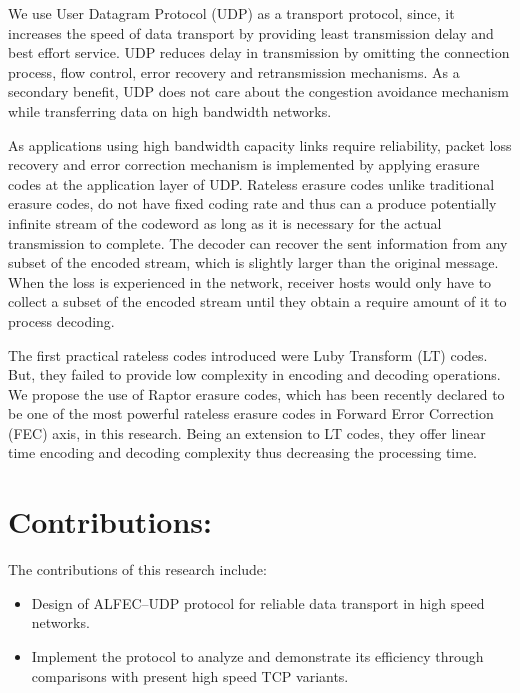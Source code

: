 We use User Datagram Protocol (UDP) as a transport protocol, since, it increases the speed of data transport by providing least transmission delay and best effort service. UDP reduces delay in transmission by omitting the connection process, flow control, error recovery and retransmission mechanisms. As a secondary benefit, UDP does not care about the congestion avoidance mechanism while transferring data on high bandwidth networks. 

As applications using high bandwidth capacity links require reliability, packet loss recovery and error correction mechanism is implemented by applying erasure codes at the application layer of UDP. Rateless erasure codes unlike traditional erasure codes, do not have fixed coding rate and thus can a produce potentially infinite stream of the codeword as long as it is necessary for the actual transmission to complete. The decoder can recover the sent information from any subset of the encoded stream, which is slightly larger than the original message. When the loss is experienced in the network, receiver hosts would only have to collect a subset of the encoded stream until they obtain a require amount of it to process decoding. 

The first practical rateless codes introduced were Luby Transform (LT) codes. But, they failed to provide low complexity in encoding and decoding operations. We propose the use of Raptor erasure codes, \cite{shokrollahi2006raptor} which has been recently declared to be one of the most powerful rateless erasure codes in Forward Error Correction (FEC) axis, in this research. Being an extension to LT codes, they offer linear time encoding and decoding complexity thus decreasing the processing time.

\section{Contributions:} 
The contributions of this research include:
\begin{itemize}
\item Design of ALFEC--UDP protocol for reliable data transport in high speed networks.
\item Implement the protocol to analyze and demonstrate its efficiency through comparisons with present high speed TCP variants.
\end{itemize}

